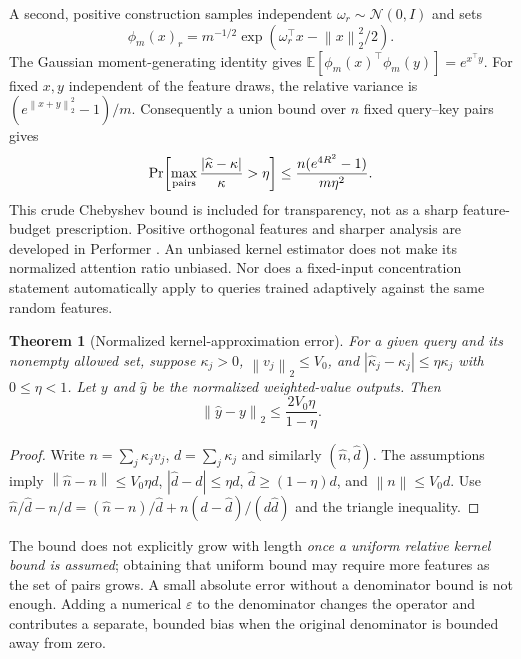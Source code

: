 \documentclass{article}
\newtheorem{theorem}{Theorem}[section]
\theoremstyle{remark}\newtheorem{remark}[theorem]{Remark}
\newcommand{\E}{\mathbb E}
\newcommand{\norm}[1]{\left\lVert #1\right\rVert}
\begin{document}
A second, positive construction samples independent $\omega_r\sim\mathcal N(0,I)$ and sets
\begin{equation}
 \phi_m(x)_r=m^{-1/2}\exp(\omega_r^\top x-\norm{x}_2^2/2).
 \label{eq:positivefeatures}
\end{equation}
The Gaussian moment-generating identity gives
$\E[\phi_m(x)^\top\phi_m(y)]=e^{x^\top y}$. For fixed $x,y$ independent of the feature draws, the relative variance is
$(e^{\norm{x+y}_2^2}-1)/m$. Consequently a union bound over $n$ fixed query--key pairs gives
\begin{equation}
 \Pr\!\left[\max_{\rm pairs}\frac{|\widehat\kappa-\kappa|}{\kappa}>\eta\right]
 \le\frac{n(e^{4R^2}-1)}{m\eta^2}.
 \label{eq:cruderandomfeature}
\end{equation}
This crude Chebyshev bound is included for transparency, not as a sharp feature-budget prescription. Positive orthogonal features and sharper analysis are developed in Performer \cite{performer}. An unbiased kernel estimator does not make its normalized attention ratio unbiased. Nor does a fixed-input concentration statement automatically apply to queries trained adaptively against the same random features.

\begin{theorem}[Normalized kernel-approximation error]
\label{thm:kernel}
For a given query and its nonempty allowed set, suppose $\kappa_j>0$, $\norm{v_j}_2\le V_0$, and
$|\widehat\kappa_j-\kappa_j|\le\eta\kappa_j$ with $0\le\eta<1$. Let $y$ and $\widehat y$ be the normalized weighted-value outputs. Then
\begin{equation}
 \norm{\widehat y-y}_2\le\frac{2V_0\eta}{1-\eta}.
 \label{eq:kernelbound}
\end{equation}
\end{theorem}
\begin{proof}
Write $n=\sum_j\kappa_jv_j$, $d=\sum_j\kappa_j$ and similarly $(\widehat n,\widehat d)$. The assumptions imply
$\norm{\widehat n-n}\le V_0\eta d$, $|\widehat d-d|\le\eta d$, $\widehat d\ge(1-\eta)d$, and $\norm{n}\le V_0d$.
Use $\widehat n/\widehat d-n/d=(\widehat n-n)/\widehat d+n(d-\widehat d)/(d\widehat d)$ and the triangle inequality.
\end{proof}
The bound does not explicitly grow with length \emph{once a uniform relative kernel bound is assumed}; obtaining that uniform bound may require more features as the set of pairs grows. A small absolute error without a denominator bound is not enough. Adding a numerical $\varepsilon$ to the denominator changes the operator and contributes a separate, bounded bias when the original denominator is bounded away from zero.
\end{document}
